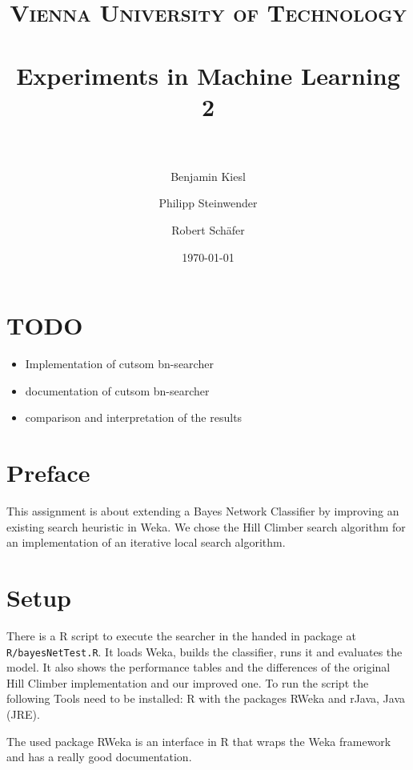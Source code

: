 \documentclass[paper=a4, fontsize=11pt]{scrartcl} %
\title{ 
\normalfont \normalsize 
\textsc{Vienna University of Technology} \\ [25pt] %
\horrule{0.5pt} \\[0.4cm] %
\huge Experiments in Machine Learning 2 \\ %
\horrule{2pt} \\[0.5cm] %
}
\author{Benjamin Kiesl \and Philipp Steinwender \and Robert Sch\"{a}fer} %
\date{\normalsize\today} %
\numberwithin{equation}{section} %
\numberwithin{figure}{section} %
\numberwithin{table}{section} %
\begin{document}
\maketitle %


\tableofcontents

%
%
%
\section{TODO}

\begin{itemize}
\item Implementation of cutsom bn-searcher
\item documentation of cutsom bn-searcher
\item comparison and interpretation of the results
\end{itemize}

%
%
%
\section{Preface}

This assignment is about extending a Bayes Network Classifier by improving an existing search heuristic in Weka. We chose the Hill Climber search algorithm for an implementation of an iterative local search algorithm.

%
%
%
\section{Setup}

There is a R script to execute the searcher in the handed in package at \texttt{R/bayesNetTest.R}. It loads Weka, builds the classifier, runs it and evaluates the model. It also shows the performance tables and the differences of the original Hill Climber implementation and our improved one. To run the script the following Tools need to be installed: R with the packages RWeka and rJava, Java (JRE).

The used package RWeka is an interface in R that wraps the Weka framework and has a really good documentation.
\end{document}
